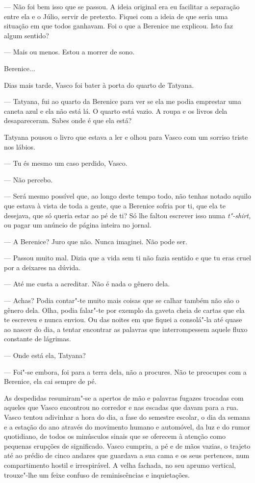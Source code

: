 --- Não foi bem isso que se passou. A ideia original era eu facilitar a
  separação entre ela e o Júlio, servir de pretexto. Fiquei com a ideia
  de que seria uma situação em que todos ganhavam. Foi o que a Berenice
  me explicou. Isto faz algum sentido?

--- Mais ou menos. Estou a morrer de sono.

Berenice...


Dias mais tarde, Vasco foi bater à porta do quarto de Tatyana.

--- Tatyana, fui ao quarto da Berenice para ver se ela me podia emprestar
  uma caneta azul e ela não está lá. O quarto está vazio. A roupa e os
  livros dela desapareceram. Sabes onde é que ela está?


Tatyana pousou o livro que estava a ler e olhou para Vasco com um
sorriso triste nos lábios.

--- Tu és mesmo um caso perdido, Vasco.

--- Não percebo.

--- Será mesmo possível que, ao longo deste tempo todo, não tenhas notado
  aquilo que estava à vista de toda a gente, que a Berenice sofria por
  ti, que ela te desejava, que só queria estar ao pé de ti? Só lhe
  faltou escrever isso numa \emph{t"-shirt, }ou pagar um anúncio de
  página inteira no jornal.

--- A Berenice? Juro que não. Nunca imaginei. Não pode ser.

--- Passou muito mal. Dizia que a vida sem ti não fazia
sentido e que tu eras cruel por a deixares na dúvida.

--- Até me custa a acreditar. Não é nada o gênero dela.

--- Achas? Podia contar"-te muito mais coisas que se calhar
também não são o gênero dela. Olha, podia falar"-te por exemplo
da gaveta cheia de cartas que ela te escreveu e nunca enviou. Ou das
noites em que fiquei a consolá"-la até quase ao nascer do dia, a tentar
encontrar as palavras que interrompessem aquele fluxo constante de
lágrimas.

--- Onde está ela, Tatyana?

--- Foi"-se embora, foi para a terra dela, não a procures.
Não te preocupes com a Berenice, ela cai sempre de pé.

As despedidas resumiram"-se a apertos de mão e palavras fugazes trocadas
com aqueles que Vasco encontrou no corredor e nas escadas que davam para
a rua. Vasco tentou adivinhar a hora do dia, a fase do semestre escolar,
o dia da semana e a estação do ano através do movimento humano e
automóvel, da luz e do rumor quotidiano, de todos os minúsculos sinais
que se oferecem à atenção como pequenas erupções de significado. Vasco
cumpriu, a pé e de mãos vazias, o trajeto até ao prédio de cinco
andares que guardava a sua cama e os seus pertences, num compartimento
hostil e irrespirável. A velha fachada, no seu aprumo vertical,
trouxe"-lhe um feixe confuso de reminiscências e inquietações.

